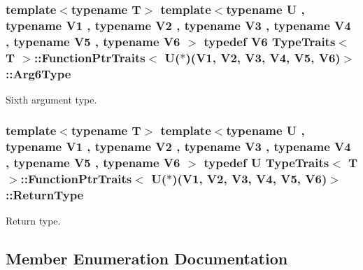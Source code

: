 \subsubsection[{\texorpdfstring{Arg6\+Type}{Arg6Type}}]{\setlength{\rightskip}{0pt plus 5cm}template$<$typename T$>$ template$<$typename U , typename V1 , typename V2 , typename V3 , typename V4 , typename V5 , typename V6 $>$ typedef V6 {\bf Type\+Traits}$<$ T $>$\+::{\bf Function\+Ptr\+Traits}$<$ U($\ast$)(V1, V2, V3, V4, V5, V6)$>$\+::{\bf Arg6\+Type}}\hypertarget{structTypeTraits_1_1FunctionPtrTraits_3_01U_07_5_08_07V1_00_01V2_00_01V3_00_01V4_00_01V5_00_01V6_08_4_af899df4f76ce03698802ce16e3a61548}{}\label{structTypeTraits_1_1FunctionPtrTraits_3_01U_07_5_08_07V1_00_01V2_00_01V3_00_01V4_00_01V5_00_01V6_08_4_af899df4f76ce03698802ce16e3a61548}
Sixth argument type. 
\subsubsection[{\texorpdfstring{Return\+Type}{ReturnType}}]{\setlength{\rightskip}{0pt plus 5cm}template$<$typename T$>$ template$<$typename U , typename V1 , typename V2 , typename V3 , typename V4 , typename V5 , typename V6 $>$ typedef U {\bf Type\+Traits}$<$ T $>$\+::{\bf Function\+Ptr\+Traits}$<$ U($\ast$)(V1, V2, V3, V4, V5, V6)$>$\+::{\bf Return\+Type}}\hypertarget{structTypeTraits_1_1FunctionPtrTraits_3_01U_07_5_08_07V1_00_01V2_00_01V3_00_01V4_00_01V5_00_01V6_08_4_ab7fc3905bb964e81f246de52f783e670}{}\label{structTypeTraits_1_1FunctionPtrTraits_3_01U_07_5_08_07V1_00_01V2_00_01V3_00_01V4_00_01V5_00_01V6_08_4_ab7fc3905bb964e81f246de52f783e670}
Return type. 

\subsection{Member Enumeration Documentation}
